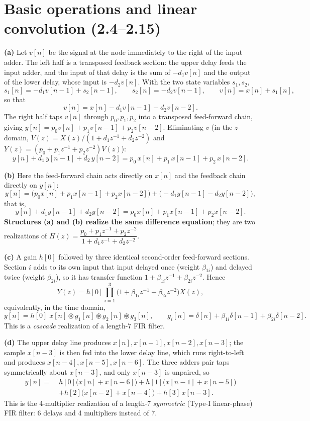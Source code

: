 \section{Basic operations and linear convolution (2.4--2.15)}


\textbf{(a)} Let $v[n]$ be the signal at the node immediately to the right of the input adder.
The left half is a transposed feedback section: the upper delay feeds the input adder, and the
input of that delay is the sum of $-d_1v[n]$ and the output of the lower delay, whose input is
$-d_2v[n]$. With the two state variables $s_1,s_2$,
\[
s_1[n]=-d_1v[n-1]+s_2[n-1],\qquad s_2[n]=-d_2v[n-1],\qquad v[n]=x[n]+s_1[n],
\]
so that
\[
v[n]=x[n]-d_1v[n-1]-d_2v[n-2].
\]
The right half taps $v[n]$ through $p_0,p_1,p_2$ into a transposed feed-forward chain, giving
$y[n]=p_0v[n]+p_1v[n-1]+p_2v[n-2]$. Eliminating $v$ (in the $z$-domain,
$V(z)=X(z)/(1+d_1z^{-1}+d_2z^{-2})$ and $Y(z)=(p_0+p_1z^{-1}+p_2z^{-2})V(z)$):
\[
\boxed{\;y[n]+d_1\,y[n-1]+d_2\,y[n-2]=p_0\,x[n]+p_1\,x[n-1]+p_2\,x[n-2].\;}
\]

\textbf{(b)} Here the feed-forward chain acts directly on $x[n]$ and the feedback chain
directly on $y[n]$:
\[
y[n]=\bigl(p_0x[n]+p_1x[n-1]+p_2x[n-2]\bigr)+\bigl(-d_1y[n-1]-d_2y[n-2]\bigr),
\]
that is,
\[
\boxed{\;y[n]+d_1y[n-1]+d_2y[n-2]=p_0x[n]+p_1x[n-1]+p_2x[n-2].\;}
\]
\textbf{Structures (a) and (b) realize the same difference equation}; they are two
realizations of
$H(z)=\dfrac{p_0+p_1z^{-1}+p_2z^{-2}}{1+d_1z^{-1}+d_2z^{-2}}$.

\textbf{(c)} A gain $h[0]$ followed by three identical second-order feed-forward sections.
Section $i$ adds to its own input that input delayed once (weight $\beta_{1i}$) and delayed
twice (weight $\beta_{2i}$), so it has transfer function $1+\beta_{1i}z^{-1}+\beta_{2i}z^{-2}$.
Hence
\[
\boxed{\;Y(z)=h[0]\prod_{i=1}^{3}\bigl(1+\beta_{1i}z^{-1}+\beta_{2i}z^{-2}\bigr)X(z),\;}
\]
equivalently, in the time domain,
\[
y[n]=h[0]\;x[n]\circledast g_1[n]\circledast g_2[n]\circledast g_3[n],\qquad
g_i[n]=\delta[n]+\beta_{1i}\delta[n-1]+\beta_{2i}\delta[n-2].
\]
This is a \emph{cascade} realization of a length-7 FIR filter.

\textbf{(d)} The upper delay line produces $x[n],x[n-1],x[n-2],x[n-3]$; the sample $x[n-3]$ is
then fed into the lower delay line, which runs right-to-left and produces
$x[n-4],x[n-5],x[n-6]$. The three adders pair taps symmetrically about $x[n-3]$, and only
$x[n-3]$ is unpaired, so
\[
\boxed{\;
\begin{aligned}
y[n]=\;&h[0]\bigl(x[n]+x[n-6]\bigr)+h[1]\bigl(x[n-1]+x[n-5]\bigr)\\
      &+h[2]\bigl(x[n-2]+x[n-4]\bigr)+h[3]\,x[n-3].
\end{aligned}\;}
\]
This is the 4-multiplier realization of a length-7 \emph{symmetric} (Type-I linear-phase)
FIR filter: 6 delays and 4 multipliers instead of 7.

